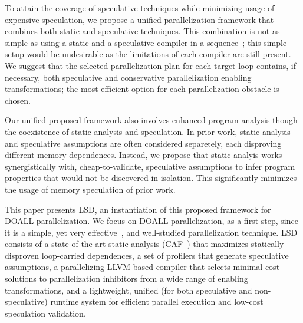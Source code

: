 To attain the coverage of speculative techniques while minimizing usage of
expensive speculation,
we propose a unified parallelization framework that combines both static and
speculative techniques.
%
This combination is not as simple as using a static and a speculative compiler
in a sequence~\cite{clusterDOALL,...}; this simple setup would be undesirable as
the limitations of each compiler are still present.
%
We suggest that the selected parallelization plan for each target loop contains,
if necessary, both speculative and conservative parallelization enabling
transformations; the most efficient option for each parallelization obstacle is
chosen.
%
%

Our unified proposed framework also involves enhanced program analysis though
the coexistence of static analysis and speculation. In prior work, static
analysis and speculative assumptions are often considered separetely, each
disproving different memory dependences. Instead, we propose that static analyis
works synergistically with, cheap-to-validate, speculative assumptions to infer
program properties that would not be discovered in isolation. This significantly
minimizes the usage of memory speculation of prior work.




This paper presents LSD, an instantiation of this proposed framework for DOALL
parallelization. We focus on DOALL parallelization, as a first step, since it is
a simple, yet very effective~\cite{Uncovering Mahlke paper}, and well-studied
parallelization technique.
%
LSD consists of a state-of-the-art static analysis (CAF~\cite{..}) that
maximizes statically disproven loop-carried dependences, a set of profilers that
generate speculative assumptions, a parallelizing LLVM-based compiler that
selects minimal-cost solutions to parallelization inhibitors from a wide range
of enabling transformations, and a lightweight, unified (for both speculative
and non-speculative) runtime system for efficient parallel execution and
low-cost speculation validation.
%

